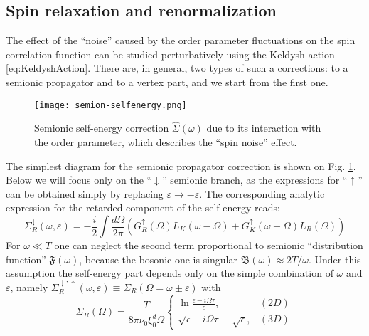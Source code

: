 \documentclass[twocolumn,english,prb]{revtex4-1}
\begin{document}
\subsection{Spin relaxation and renormalization}

The effect of the ``noise'' caused by the order parameter fluctuations  on the spin correlation function can be studied perturbatively using the Keldysh action \eqref{eq:KeldyshAction}. There are, in general, two types of such a corrections:
to a semionic propagator and to a vertex part, and we start from the first one.

\begin{figure}
	\centering
	\texttt{[image: semion-selfenergy.png]}
	\caption{Semionic self-energy correction $\hat{\Sigma}(\omega)$ due to its interaction with the order parameter, which describes the ``spin noise'' effect.}
	\label{fig:SemionSelfEnergy}	
\end{figure}

The simplest diagram for the semionic propagator correction is shown on Fig. \ref{fig:SemionSelfEnergy}. 
Below we will focus only on the ``$\downarrow$'' semionic branch, as the expressions for ``$\uparrow$'' can be obtained simply by replacing $\varepsilon \to -\varepsilon$. 
The corresponding analytic expression for the retarded component of the self-energy reads:
\begin{equation}
\label{eq:SemionSelfEnergy}
\Sigma_{R}^{\downarrow}(\omega,\varepsilon)=-\frac{i}{2}\int\frac{d\Omega}{2\pi}(G_{R}^{\uparrow}(\Omega)L_{K}(\omega-\Omega)+G_{K}^{\uparrow}(\omega-\Omega)L_{R}(\Omega))
\end{equation}
For $\omega \ll T$ one can neglect the second term proportional to semionic ``distribution function'' $\mathfrak{F}(\omega)$, because the bosonic one is singular $\mathfrak{B}(\omega) \approx 2 T / \omega$. 
Under this assumption the self-energy part depends only on the simple combination of $\omega$ and $\varepsilon$, namely $\Sigma_R^{\downarrow,\uparrow}(\omega,\varepsilon) \equiv \Sigma_R(\Omega = \omega \pm \varepsilon)$ with
\begin{equation}
\label{eq:SemionicSelfEnergy}
\Sigma_{R}(\Omega)=\frac{T}{8\pi\nu_{0}\xi_{0}^{d}\Omega}\begin{cases}
\ln\frac{\epsilon-i\Omega\tau}{\epsilon}, & (2D)\\
\sqrt{\epsilon-i\Omega\tau}-\sqrt{\epsilon}, & (3D)
\end{cases}
\end{equation}
\end{document}
